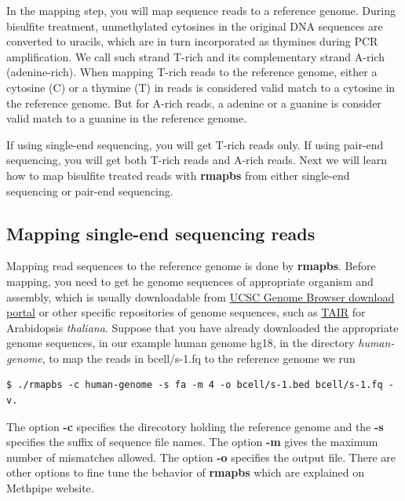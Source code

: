 \documentclass{article}
\begin{document}
In the mapping step, you will map sequence reads to a reference
genome. During bisulfite treatment, unmethylated cytosines in the
original DNA sequences are converted to uracils, which are in turn
incorporated as thymines during PCR amplification. We call such strand
T-rich and its complementary strand A-rich (adenine-rich).  When
mapping T-rich reads to the reference genome, either a cytosine (C) or
a thymine (T) in reads is considered valid match to a cytosine in the
reference genome. But for A-rich reads, a adenine or a guanine is
consider valid match to a guanine in the reference genome.    

If using single-end sequencing, you will get T-rich reads only. If
using pair-end sequencing, you will get both T-rich reads and A-rich
reads. Next we will learn how to map bisulfite treated reads with
\textbf{rmapbs} from either single-end sequencing or pair-end
sequencing. 

\subsection{Mapping single-end sequencing reads}
\label{sec:mapping-single-end}
Mapping read sequences to the reference genome is done by
\textbf{rmapbs}. Before mapping, you need to get he genome sequences
of appropriate organism and assembly, which is usually downloadable
from \href{http://hgdownload.cse.ucsc.edu/downloads.html}{UCSC Genome
  Browser download portal} or other specific repositories of genome
sequences, such as \href{http://www.arabidopsis.org/}{TAIR} for
Arabidopsis \textit{thaliana}. Suppose that you have already
downloaded the appropriate genome sequences, in our example human
genome hg18, in the directory \textit{human-genome}, to map the reads
in bcell/s-1.fq to the reference genome we run
\begin{verbatim}
$ ./rmapbs -c human-genome -s fa -m 4 -o bcell/s-1.bed bcell/s-1.fq -v. 
\end{verbatim}
The option \textbf{-c} specifies the direcotory holding the reference
genome and the \textbf{-s} specifies the suffix of sequence file
names. The option \textbf{-m} gives the maximum number of mismatches
allowed. The option \textbf{-o} specifies the output file. There are
other options to fine tune the behavior of \textbf{rmapbs} which are
explained on Methpipe website.  
\end{document}
